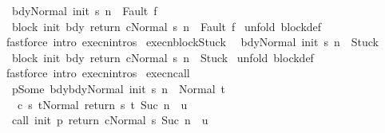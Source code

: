 \begin{isabellebody}
\ \ {\isachardoublequoteopen}{\isasymlbrakk}{\isasymGamma}{\isasymturnstile}{\isasymlangle}bdy{\isacharcomma}Normal\ {\isacharparenleft}init\ s{\isacharparenright}{\isasymrangle}\ {\isacharequal}n{\isasymRightarrow}\ \ Fault\ f{\isasymrbrakk}\isanewline
\ \ \ {\isasymLongrightarrow}\ \isanewline
\ \ {\isasymGamma}{\isasymturnstile}{\isasymlangle}block\ init\ bdy\ return\ c{\isacharcomma}Normal\ s{\isasymrangle}\ {\isacharequal}n{\isasymRightarrow}\ \ Fault\ f{\isachardoublequoteclose}\isanewline
%
\isadelimproof
%
\endisadelimproof
%
\isatagproof
{}\isamarkupfalse%
\ {\isacharparenleft}unfold\ block{\isacharunderscore}def{\isacharparenright}\isanewline
{}\isamarkupfalse%
\ {\isacharparenleft}fastforce\ intro{\isacharcolon}\ execn{\isachardot}intros{\isacharparenright}%
\endisatagproof
{\isafoldproof}%
%
\isadelimproof
\isanewline
%
\endisadelimproof
\isanewline
{}\isamarkupfalse%
\ execn{\isacharunderscore}blockStuck{\isacharcolon}\isanewline
\ \ {\isachardoublequoteopen}{\isasymlbrakk}{\isasymGamma}{\isasymturnstile}{\isasymlangle}bdy{\isacharcomma}Normal\ {\isacharparenleft}init\ s{\isacharparenright}{\isasymrangle}\ {\isacharequal}n{\isasymRightarrow}\ \ Stuck{\isasymrbrakk}\isanewline
\ \ {\isasymLongrightarrow}\ \isanewline
\ \ {\isasymGamma}{\isasymturnstile}{\isasymlangle}block\ init\ bdy\ return\ c{\isacharcomma}Normal\ s{\isasymrangle}\ {\isacharequal}n{\isasymRightarrow}\ \ Stuck{\isachardoublequoteclose}\isanewline
%
\isadelimproof
%
\endisadelimproof
%
\isatagproof
{}\isamarkupfalse%
\ {\isacharparenleft}unfold\ block{\isacharunderscore}def{\isacharparenright}\isanewline
{}\isamarkupfalse%
\ {\isacharparenleft}fastforce\ intro{\isacharcolon}\ execn{\isachardot}intros{\isacharparenright}%
\endisatagproof
{\isafoldproof}%
%
\isadelimproof
\isanewline
%
\endisadelimproof
\isanewline
\isanewline
{}\isamarkupfalse%
\ execn{\isacharunderscore}call{\isacharcolon}\ \ \ \isanewline
\ {\isachardoublequoteopen}{\isasymlbrakk}{\isasymGamma}\ p{\isacharequal}Some\ bdy{\isacharsemicolon}{\isasymGamma}{\isasymturnstile}{\isasymlangle}bdy{\isacharcomma}Normal\ {\isacharparenleft}init\ s{\isacharparenright}{\isasymrangle}\ {\isacharequal}n{\isasymRightarrow}\ \ Normal\ t{\isacharsemicolon}\ \isanewline
\ \ \ {\isasymGamma}{\isasymturnstile}{\isasymlangle}c\ s\ t{\isacharcomma}Normal\ {\isacharparenleft}return\ s\ t{\isacharparenright}{\isasymrangle}\ {\isacharequal}Suc\ n{\isasymRightarrow}\ \ u{\isasymrbrakk}\ \isanewline
\ \ {\isasymLongrightarrow}\ \isanewline
\ \ {\isasymGamma}{\isasymturnstile}{\isasymlangle}call\ init\ p\ return\ c{\isacharcomma}Normal\ s{\isasymrangle}\ {\isacharequal}Suc\ n{\isasymRightarrow}\ \ u{\isachardoublequoteclose}\isanewline

\end{isabellebody}
